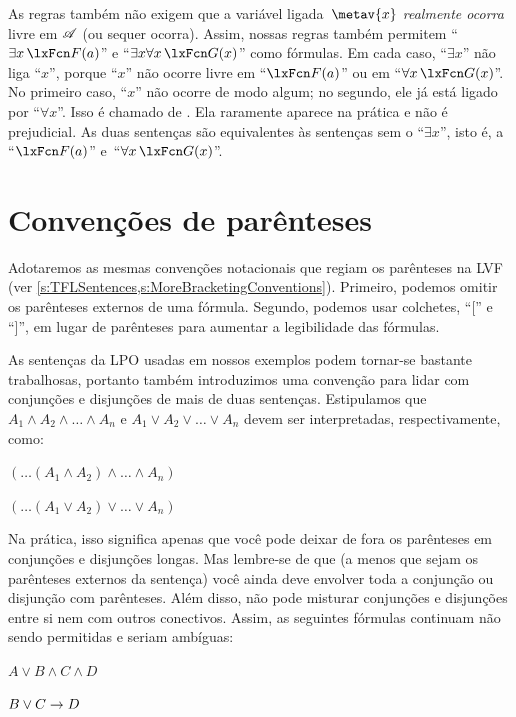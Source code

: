 As regras também não exigem que a variável ligada~$\metav{x}$ \emph{realmente ocorra} livre em $\mathscr{A}$ (ou sequer ocorra). Assim, nossas regras também permitem \textquotedblleft $\exists x\,\atom{F}{a}$\textquotedblright{} e \textquotedblleft $\exists x\forall x\,\atom{G}{x}$\textquotedblright{} como fórmulas. Em cada caso, \textquotedblleft $\exists x$\textquotedblright{} não liga \textquotedblleft $x$\textquotedblright{}, porque \textquotedblleft $x$\textquotedblright{} não ocorre livre em \textquotedblleft $\atom{F}{a}$\textquotedblright{} ou em \textquotedblleft $\forall x\,\atom{G}{x}$\textquotedblright{}. No primeiro caso, \textquotedblleft $x$\textquotedblright{} não ocorre de modo algum; no segundo, ele já está ligado por \textquotedblleft $\forall x$\textquotedblright{}. Isso é chamado de . Ela raramente aparece na prática e não é prejudicial. As duas sentenças são equivalentes às sentenças sem o \textquotedblleft $\exists x$\textquotedblright{}, isto é, a \textquotedblleft $\atom{F}{a}$\textquotedblright{} e~\textquotedblleft $\forall x\,\atom{G}{x}$\textquotedblright{}.











\section{Convenções de parênteses}

Adotaremos as mesmas convenções notacionais que regiam os parênteses na LVF (ver \cref{s:TFLSentences,s:MoreBracketingConventions}). Primeiro, podemos omitir os parênteses externos de uma fórmula. Segundo, podemos usar colchetes, \textquotedblleft [\textquotedblright{} e \textquotedblleft ]\textquotedblright{}, em lugar de parênteses para aumentar a legibilidade das fórmulas.

As sentenças da LPO usadas em nossos exemplos podem tornar-se bastante trabalhosas, portanto também introduzimos uma convenção para lidar com conjunções e disjunções de mais de duas sentenças. Estipulamos que $A_1 \land A_2 \land \dots \land A_n$ e $A_1 \lor A_2 \lor \dots \lor A_n$ devem ser interpretadas, respectivamente, como:
\begin{earg}
	\item[] $(\dots(A_1 \land A_2) \land \dots \land A_n)$
	\item[] $(\dots(A_1 \lor A_2) \lor \dots \lor A_n)$
\end{earg}
Na prática, isso significa apenas que você pode deixar de fora os parênteses em conjunções e disjunções longas. Mas lembre-se de que (a menos que sejam os parênteses externos da sentença) você ainda deve envolver toda a conjunção ou disjunção com parênteses. Além disso, não pode misturar conjunções e disjunções entre si nem com outros conectivos. Assim, as seguintes fórmulas continuam não sendo permitidas e seriam ambíguas:
\begin{earg}
	\item[] $A \lor B \land C \land D$
	\item[] $B \lor C \rightarrow D$
\end{earg}

